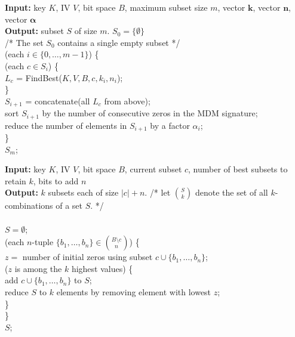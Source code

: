 {
{
	\textbf{Input:} key $K$, IV $V$, bit space $B$, maximum subset size $m$, vector $\bm{k}$, vector $\bm{n}$, vector $\bm{\alpha}$ \\
	\textbf{Output:} subset $S$ of size $m$.
}
{
	$S_0 = \{\emptyset\}$ \\
    /* The set $S_0$ contains a single empty subset */\\
	\cfor{} (each $i \in \{0, \ldots, m - 1\}$) \{ \\
	\indent\hspace{0.4cm}\cfor{} (each $c \in S_i$) \{ \\
	\indent\hspace{0.8cm}    $L_c$ = FindBest($K, V, B, c, k_i, n_i$); \\
	\indent\hspace{0.4cm}\} \\
	\indent\hspace{0.4cm}$S_{i+1}$ = concatenate(all $L_c$ from above); \\
	\indent\hspace{0.4cm}sort $S_{i+1}$ by the number of consecutive zeros in the MDM signature; \\
	\indent\hspace{0.4cm}reduce the number of elements in $S_{i+1}$ by a factor $\alpha_i$; \\
	\} \\
	\creturn{} $S_m$;
}

{
	\textbf{Input:} key $K$, IV $V$, bit space $B$, current subset $c$, number of best subsets to retain $k$, bits to add $n$ \\
	\textbf{Output:} $k$ subsets each of size $|c| + n$.
}
{
	/* let $\binom{S}{k}$ denote the set of all $k$-combinations of a set $S$. */ \\
	\\
	$S = \emptyset$; \\
	\cfor{} (each $n$-tuple $\{b_1, \ldots, b_n\} \in \binom{B\setminus c}{n}$) \{ \\
	\indent\hspace{0.4cm}$z = $ number of initial zeros using subset $c \cup \{b_1, \ldots, b_n\}$; \\
	\indent\hspace{0.4cm}\cif{} ($z$ is among the $k$ highest values) \{ \\
	\indent\hspace{0.8cm}    add $c \cup \{b_1, \ldots, b_n\}$ to $S$; \\
	\indent\hspace{0.8cm}    reduce $S$ to $k$ elements by removing element with lowest $z$; \\
	\indent\hspace{0.4cm}\} \\
	\} \\
	\creturn{} $S$;
}

}
